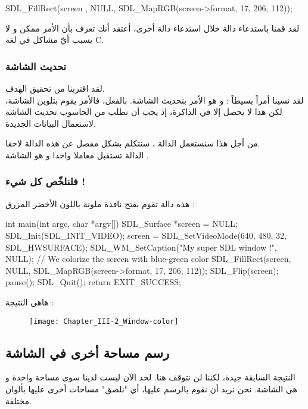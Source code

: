 \begin{Csource}
SDL_FillRect(screen , NULL, SDL_MapRGB(screen->format, 17, 206, 112));
\end{Csource}

لقد قمنا باستدعاء دالة خلال استدعاء دالة أخرى، أعتقد أنك تعرف بأن الأمر ممكن و لا يسبب أيّ مشاكل في لغة
\textenglish{C}.

\subsubsection{تحديث الشاشة}

لقد اقتربنا من تحقيق الهدف.\\
لقد نسينا أمراً بسيطاً : و هو الأمر بتحديث الشاشة. بالفعل، فالأمر 
يقوم بتلوين الشاشة، لكن هذا لا يحصل إلا في الذاكرة، إذ يجب أن نطلب من الحاسوب تحديث الشاشة لاستعمال البيانات الجديدة.

من أجل هذا سنستعمل الدالة 
،
سنتكلم بشكل مفصل عن هذه الدالة لاحقا.\\
الدالة تستقبل معاملا واحدا و هو الشاشة
.

\subsubsection{فلنلخّص كل شيء !}

هذه دالة
تقوم بفتح نافذة ملونة باللون الأخضر المزرق :

\begin{Csource}
int main(int argc, char *argv[])
{
	SDL_Surface *screen = NULL;
	SDL_Init(SDL_INIT_VIDEO);
	screen = SDL_SetVideoMode(640, 480, 32, SDL_HWSURFACE);
	SDL_WM_SetCaption("My super SDL window !", NULL);
	// We colorize the screen with blue-green color
	SDL_FillRect(screen, NULL, SDL_MapRGB(screen->format, 17, 206, 112));
	SDL_Flip(screen); 
	pause();
	SDL_Quit();
	return EXIT_SUCCESS;
}
\end{Csource}

هاهي النتيجة :

\begin{figure}[H]
	\centering
	\texttt{[image: Chapter\_III-2\_Window-color]}
\end{figure}

\subsection{رسم مساحة أخرى في الشاشة}

النتيجة السابقة جيدة، لكننا لن نتوقف هنا. لحد الآن ليست لدينا سوى مساحة واحدة و هي الشاشة. نحن نريد أن نقوم بالرسم عليها، أي "نلصق" مساحات أخرى عليها بألوان مختلفة.


